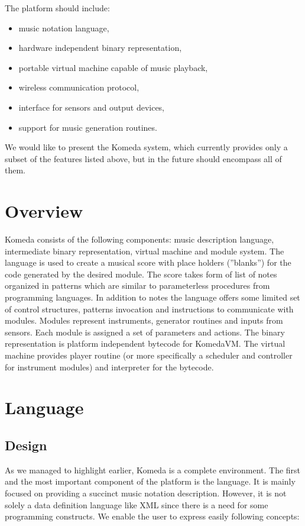\documentclass{article}
\begin{document}
The platform should include:
\begin{itemize}
  \item music notation language,
  \item hardware independent binary representation,
  \item portable virtual machine capable of music playback,
  \item wireless communication protocol,
  \item interface for sensors and output devices,
  \item support for music generation routines.
\end{itemize}

We would like to present the Komeda system, which currently provides only a
subset of the features listed above, but in the future should encompass all of
them. 

\section{Overview} 
\label{overview}

Komeda consists of the following components: music description language,
intermediate binary representation, virtual machine and module system. The
language is used to create a musical score with place holders (''blanks'') for
the code generated by the desired module. The score takes form of list of notes
organized in patterns which are similar to parameterless procedures from
programming languages. In addition to notes the language offers some limited
set of control structures, patterns invocation and instructions to communicate
with modules. Modules represent instruments, generator routines and inputs from
sensors. Each module is assigned a set of parameters and actions. The binary
representation is platform independent bytecode for KomedaVM. The virtual
machine provides player routine (or more specifically a scheduler and
controller for instrument modules) and interpreter for the bytecode.

\section{Language}
\label{lang}

\subsection{Design}
\label{lang:design}

As we managed to highlight earlier, Komeda is a complete environment. The first
and the most important component of the platform is the language. It is mainly
focused on providing a succinct music notation description. However, it is not
solely a data definition language like XML since there is a need for some
programming constructs. We enable the user to express easily following
concepts:
\end{document}
